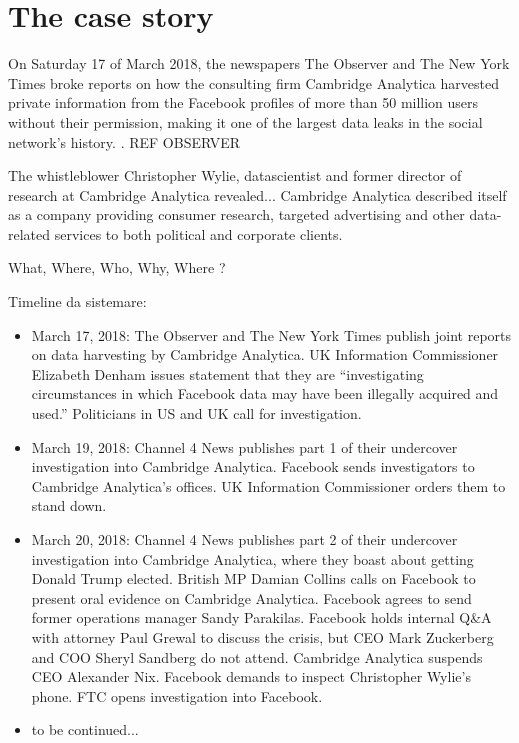 \documentclass[10pt, twoside]{report}
\begin{document}
    
    \tableofcontents
    \chapter{The case story}

On Saturday 17 of March 2018, the newspapers The Observer and The New York Times broke reports on how the consulting firm Cambridge Analytica harvested private information from the Facebook profiles of more than 50 million users without their permission, making it one of the largest data leaks in the social network’s history. \cite{nyt_17march}. REF OBSERVER

The whistleblower Christopher Wylie, datascientist and former director of research at Cambridge Analytica revealed...
Cambridge Analytica described itself as a company providing consumer research, targeted advertising and other data-related services to both political and corporate clients.

What, Where, Who, Why, Where ?


Timeline da sistemare: \cite{nyt_timeline}
\begin{itemize}

\item March 17, 2018: The Observer and The New York Times publish joint reports on data harvesting by Cambridge Analytica. UK Information Commissioner Elizabeth Denham issues statement that they are “investigating circumstances in which Facebook data may have been illegally acquired and used.” Politicians in US and UK call for investigation.

\item March 19, 2018: Channel 4 News publishes part 1 of their undercover investigation into Cambridge Analytica. Facebook sends investigators to Cambridge Analytica’s offices. UK Information Commissioner orders them to stand down.

\item March 20, 2018: Channel 4 News publishes part 2 of their undercover investigation into Cambridge Analytica, where they boast about getting Donald Trump elected. British MP Damian Collins calls on Facebook to present oral evidence on Cambridge Analytica. Facebook agrees to send former operations manager Sandy Parakilas. Facebook holds internal Q\&A with attorney Paul Grewal to discuss the crisis, but CEO Mark Zuckerberg and COO Sheryl Sandberg do not attend. Cambridge Analytica suspends CEO Alexander Nix. Facebook demands to inspect Christopher Wylie’s phone. FTC opens investigation into Facebook.
\item to be continued...
\end{itemize}
\end{document}
